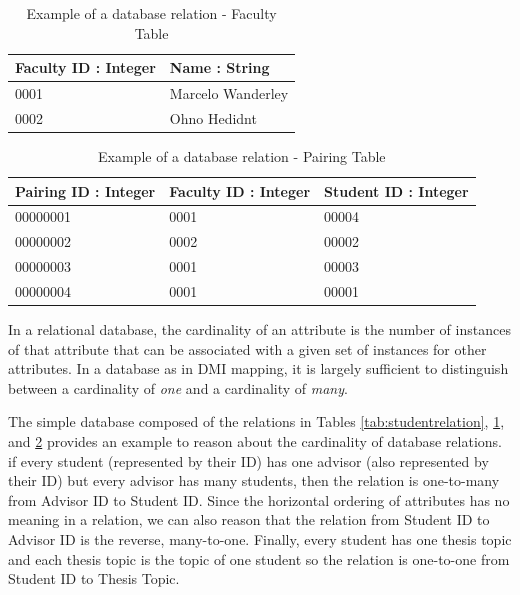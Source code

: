 \begin{table}
    \begin{center}
    \begin{tabular}{ | l | l | }
    \hline
    Faculty ID : Integer & Name : String \\ \hline
    0001 & Marcelo Wanderley \\ \hline
    0002 & Ohno Hedidnt \\
    \hline
    \end{tabular}
    \end{center}
    \caption{Example of a database relation - Faculty Table}
    \label{tab:facultyrelation}
\end{table}

\begin{table}
    \begin{center}
    \begin{tabular}{ | l | l | l | }
    \hline
    Pairing ID : Integer & Faculty ID : Integer & Student ID : Integer \\ \hline
    00000001 & 0001 & 00004 \\ \hline
    00000002 & 0002 & 00002 \\ \hline
    00000003 & 0001 & 00003 \\ \hline
    00000004 & 0001 & 00001 \\ 
    \hline
    \end{tabular}
    \end{center}
    \caption{Example of a database relation - Pairing Table}
    \label{tab:relation}
\end{table}

In a relational database, the cardinality of an attribute is the number of instances of that attribute that can be associated with a given set of instances for other attributes. In a database as in DMI mapping, it is largely sufficient to distinguish between a cardinality of \emph{one} and a cardinality of \emph{many}.

The simple database composed of the relations in Tables \ref{tab:studentrelation}, \ref{tab:facultyrelation}, and \ref{tab:relation} provides an example to reason about the cardinality of database relations. if every student (represented by their ID) has one advisor (also represented by their ID) but every advisor has many students, then the relation is one-to-many from Advisor ID to Student ID. Since the horizontal ordering of attributes has no meaning in a relation, we can also reason that the relation from Student ID to Advisor ID is the reverse, many-to-one. Finally, every student has one thesis topic and each thesis topic is the topic of one student so the relation is one-to-one from Student ID to Thesis Topic.

